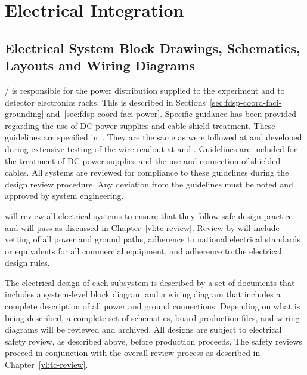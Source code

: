 

\section{Electrical Integration}
\label{sec:fdsp-Integ-electrical}


\subsection{Electrical System Block Drawings, Schematics, Layouts and Wiring Diagrams}
\label{sec:fdsp-coord-electrical}


/ is responsible for the  power distribution supplied to
the experiment and to detector electronics racks.  This is described
in Sections~\ref{sec:fdsp-coord-faci-grounding}
and~\ref{sec:fdsp-coord-faci-power}.  Specific guidance has been
provided regarding the use of DC power supplies and cable shield
treatment.  These guidelines are specified in~\cite{bib:cernedms2095958}. 
They are the same as were
followed at  and developed during extensive testing
of the  wire readout at  and .
Guidelines are included for the treatment of DC power supplies and the
use and connection of shielded cables.  All systems are reviewed for
compliance to these guidelines during the design review procedure.
Any deviation from the guidelines must be noted and approved by system
engineering.

 will review all electrical systems to ensure that they
follow safe design practice and will pass  as discussed in
Chapter~\ref{vl:tc-review}.  Review by  will include vetting
of all power and ground paths, adherence to national electrical
standards or equivalents for all commercial equipment, and adherence
to the  electrical design rules.

The electrical design of each subsystem is described by a set of
documents that includes a system-level block diagram and a wiring
diagram that includes a complete description of all power and ground
connections.  Depending on what is being described, a complete set of
schematics, board production files, and wiring diagrams will be
reviewed and archived.  All designs are subject to electrical safety
review, as described above, before production proceeds. The safety
reviews proceed in conjunction with the overall review process as
described in Chapter~\ref{vl:tc-review}.

